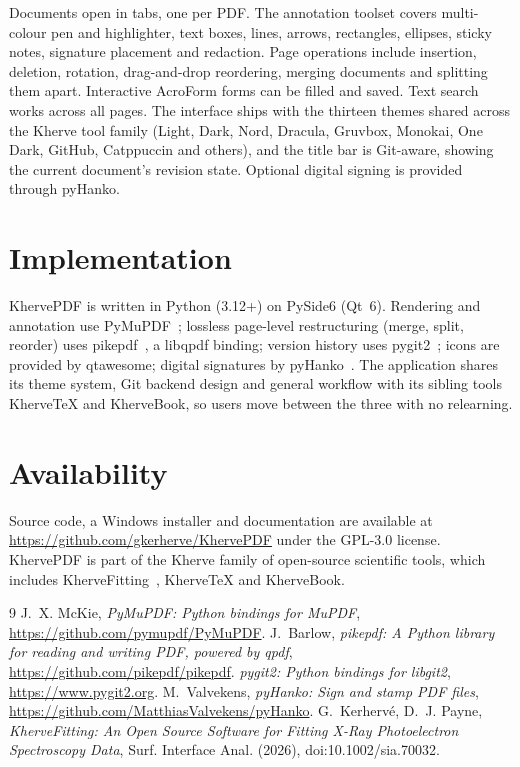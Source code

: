 \documentclass[11pt,a4paper]{article}
\begin{document}
Documents open in tabs, one per PDF. The annotation toolset covers multi-colour pen and highlighter, text boxes, lines, arrows, rectangles, ellipses, sticky notes, signature placement and redaction. Page operations include insertion, deletion, rotation, drag-and-drop reordering, merging documents and splitting them apart. Interactive AcroForm forms can be filled and saved. Text search works across all pages. The interface ships with the thirteen themes shared across the Kherve tool family (Light, Dark, Nord, Dracula, Gruvbox, Monokai, One Dark, GitHub, Catppuccin and others), and the title bar is Git-aware, showing the current document's revision state. Optional digital signing is provided through pyHanko.

\section{Implementation}

KhervePDF is written in Python (3.12+) on PySide6 (Qt~6). Rendering and annotation use PyMuPDF~\cite{pymupdf}; lossless page-level restructuring (merge, split, reorder) uses pikepdf~\cite{pikepdf}, a libqpdf binding; version history uses pygit2~\cite{pygit2}; icons are provided by qtawesome; digital signatures by pyHanko~\cite{pyhanko}. The application shares its theme system, Git backend design and general workflow with its sibling tools KherveTeX and KherveBook, so users move between the three with no relearning.

\section{Availability}

Source code, a Windows installer and documentation are available at \url{https://github.com/gkerherve/KhervePDF} under the GPL-3.0 license. KhervePDF is part of the Kherve family of open-source scientific tools, which includes KherveFitting~\cite{khervefitting}, KherveTeX and KherveBook.

\begin{thebibliography}{9}
 J.~X. McKie, \emph{PyMuPDF: Python bindings for MuPDF}, \url{https://github.com/pymupdf/PyMuPDF}.
 J.~Barlow, \emph{pikepdf: A Python library for reading and writing PDF, powered by qpdf}, \url{https://github.com/pikepdf/pikepdf}.
 \emph{pygit2: Python bindings for libgit2}, \url{https://www.pygit2.org}.
 M.~Valvekens, \emph{pyHanko: Sign and stamp PDF files}, \url{https://github.com/MatthiasValvekens/pyHanko}.
 G.~Kerhervé, D.~J. Payne, \emph{KherveFitting: An Open Source Software for Fitting X-Ray Photoelectron Spectroscopy Data}, Surf. Interface Anal. (2026), doi:10.1002/sia.70032.
\end{thebibliography}
\end{document}
